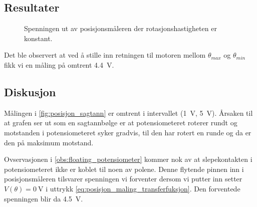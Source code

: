 \subsection{Resultater}

\begin{figure}[h]
    \centering
    
    \caption{Spenningen ut av posisjonsmåleren der rotasjonshastigheten er konstant.}
    \label{fig:posisjon_sagtann}
\end{figure}

\label{obs:floating_potensiometer}
Det ble observert at ved å stille inn retningen til motoren mellom $\theta_{max}$ og $\theta_{min}$ fikk vi en måling på omtrent \SI{4.4}{\volt}.

\subsection{Diskusjon}

Målingen i \autoref{fig:posisjon_sagtann} er omtrent i intervallet (\SI{1}{\volt}, \SI{5}{\volt}). Årsaken til at grafen ser ut som en sagtannbølge er at potensiometeret roterer rundt og motstanden i potensiometeret syker gradvis, til den har rotert en runde og da er den på maksimum motstand.

Ovservasjonen i \ref{obs:floating_potensiometer} kommer nok av at slepekontakten i potensiometeret ikke er koblet til noen av polene. Denne flytende pinnen inn i posisjonsmåleren tilsvarer spenningen vi forventer dersom vi putter inn setter $V(\theta) = \SI{0}{\volt}$ i uttrykk \eqref{eq:posisjon_maling_transferfuksjon}. Den forventede spenningen blir da \SI{4.5}{\volt}.